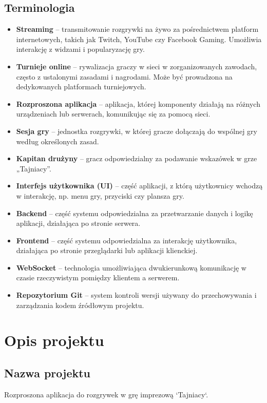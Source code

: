 \documentclass[12pt,a4paper,colorlinks=true,linkcolor=NavyBlue,citecolor=red,urlcolor=NavyBlue]{book}
\begin{document}
\section{Terminologia}
\begin{itemize}
    \item \textbf{Streaming} – transmitowanie rozgrywki na żywo za pośrednictwem platform internetowych, takich jak Twitch, YouTube czy Facebook Gaming. Umożliwia interakcję z widzami i popularyzację gry.
    \item \textbf{Turnieje online} – rywalizacja graczy w sieci w zorganizowanych zawodach, często z ustalonymi zasadami i nagrodami. Może być prowadzona na dedykowanych platformach turniejowych.
    \item \textbf{Rozproszona aplikacja} – aplikacja, której komponenty działają na różnych urządzeniach lub serwerach, komunikując się za pomocą sieci.
    \item \textbf{Sesja gry} – jednostka rozgrywki, w której gracze dołączają do wspólnej gry według określonych zasad.
    \item \textbf{Kapitan drużyny} – gracz odpowiedzialny za podawanie wskazówek w grze „Tajniacy”.
    \item \textbf{Interfejs użytkownika (UI)} – część aplikacji, z którą użytkownicy wchodzą w interakcję, np. menu gry, przyciski czy plansza gry.
    \item \textbf{Backend} – część systemu odpowiedzialna za przetwarzanie danych i logikę aplikacji, działająca po stronie serwera.
    \item \textbf{Frontend} – część systemu odpowiedzialna za interakcję użytkownika, działająca po stronie przeglądarki lub aplikacji klienckiej.
    \item \textbf{WebSocket} – technologia umożliwiająca dwukierunkową komunikację w czasie rzeczywistym pomiędzy klientem a serwerem.
    \item \textbf{Repozytorium Git} – system kontroli wersji używany do przechowywania i zarządzania kodem źródłowym projektu.
\end{itemize}


\chapter{Opis projektu}

\section{Nazwa projektu}
Rozproszona aplikacja do rozgrywek w grę imprezową `Tajniacy`.
\end{document}
